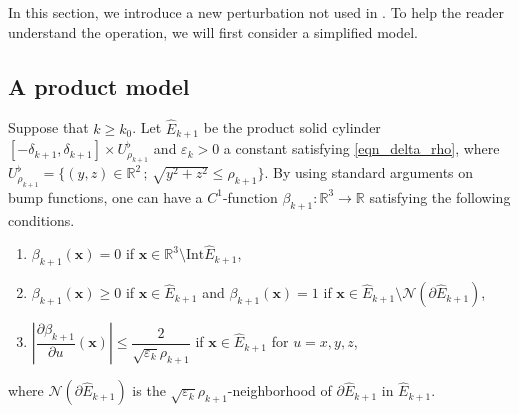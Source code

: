 \documentclass{amsart}
\theoremstyle{plain}
\theoremstyle{definition}
\numberwithin{equation}{section}
\numberwithin{figure}{section}
\def\rr{\mathbb{R}}
\def\bx{{\boldsymbol{x}}}
\def\wh{\widehat}
\def\too{\longrightarrow}
\def\ve{\varepsilon}
\begin{document}
In this section, we introduce a new perturbation not used in \cite{KNS}.
To help the reader understand the operation, we will first consider a simplified model.

\subsection{\bf A product model}

Suppose that $k\geq k_0$.
Let $\wh E_{k+1}$ be the product solid cylinder $[-\delta_{k+1},\delta_{k+1}]\times U_{\rho_{k+1}}^\flat$ 
and  $\ve_k>0$ a constant satisfying \eqref{eqn_delta_rho}, 
where $U_{\rho_{k+1}}^\flat=\{(y,z)\in \rr^2\,;\, \sqrt{y^2+z^2}\leq \rho_{k+1}\}$.
By using standard arguments on bump functions, one can have  a $C^1$-function 
$\beta_{k+1}:\rr^3\too \rr$ satisfying the following conditions.
\begin{enumerate}[({B}1)]
\makeatletter
\renewcommand{\p@enumi}{B}
\makeatother
\item
$\beta_{k+1}(\bx)=0$ if $\bx\in \rr^3\setminus \mathrm{Int}\wh E_{k+1}$,\label{B1}
\item
$\beta_{k+1}(\bx)\geq 0$ if $\bx\in \wh E_{k+1}$ and $\beta_{k+1}(\bx)=1$ if 
$\bx\in \wh E_{k+1}\setminus \mathcal{N}(\partial \wh E_{k+1})$,\label{B2}
\item
$\left|\dfrac{\partial \beta_{k+1}}{\partial u}(\bx)\right|\leq \dfrac{2}{\sqrt{\ve_k}\rho_{k+1}}$ 
if $\bx\in \wh E_{k+1}$ for $u=x,y,z$,\label{B3}
\end{enumerate}
where $\mathcal{N}(\partial \wh E_{k+1})$ is the $\sqrt{\ve_k}\rho_{k+1}$-neighborhood of $\partial \wh E_{k+1}$ in $\wh E_{k+1}$.
\end{document}
